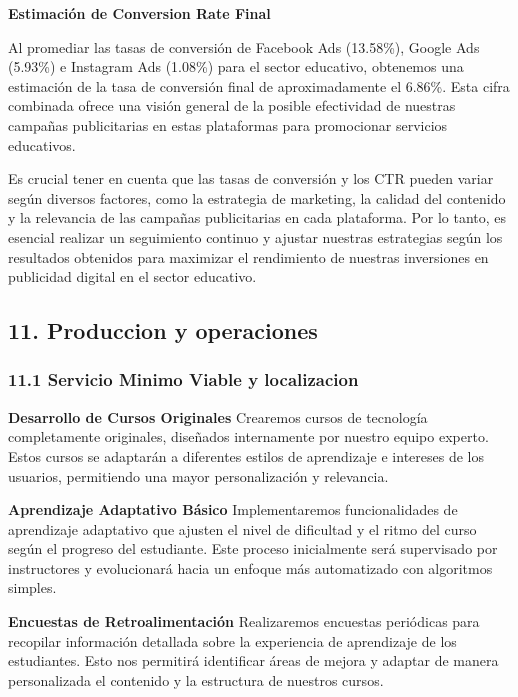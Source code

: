 \documentclass[
]{article}
\begin{document}
\textbf{Estimación de Conversion Rate Final}

Al promediar las tasas de conversión de Facebook Ads (13.58\%), Google
Ads (5.93\%) e Instagram Ads (1.08\%) para el sector educativo,
obtenemos una estimación de la tasa de conversión final de
aproximadamente el 6.86\%. Esta cifra combinada ofrece una visión
general de la posible efectividad de nuestras campañas publicitarias en
estas plataformas para promocionar servicios educativos.

Es crucial tener en cuenta que las tasas de conversión y los CTR pueden
variar según diversos factores, como la estrategia de marketing, la
calidad del contenido y la relevancia de las campañas publicitarias en
cada plataforma. Por lo tanto, es esencial realizar un seguimiento
continuo y ajustar nuestras estrategias según los resultados obtenidos
para maximizar el rendimiento de nuestras inversiones en publicidad
digital en el sector educativo.

\newpage

\subsection{11. Produccion y
operaciones}\label{produccion-y-operaciones}

\subsubsection{11.1 Servicio Minimo Viable y
localizacion}\label{servicio-minimo-viable-y-localizacion}

\textbf{Desarrollo de Cursos Originales} Crearemos cursos de tecnología
completamente originales, diseñados internamente por nuestro equipo
experto. Estos cursos se adaptarán a diferentes estilos de aprendizaje e
intereses de los usuarios, permitiendo una mayor personalización y
relevancia.

\textbf{Aprendizaje Adaptativo Básico} Implementaremos funcionalidades
de aprendizaje adaptativo que ajusten el nivel de dificultad y el ritmo
del curso según el progreso del estudiante. Este proceso inicialmente
será supervisado por instructores y evolucionará hacia un enfoque más
automatizado con algoritmos simples.

\textbf{Encuestas de Retroalimentación} Realizaremos encuestas
periódicas para recopilar información detallada sobre la experiencia de
aprendizaje de los estudiantes. Esto nos permitirá identificar áreas de
mejora y adaptar de manera personalizada el contenido y la estructura de
nuestros cursos.
\end{document}
